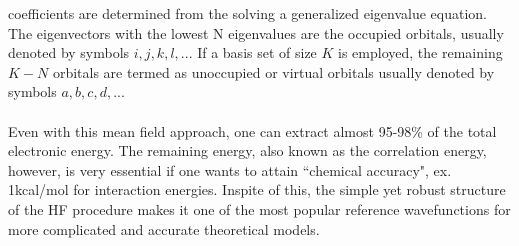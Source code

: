 coefficients are determined from the solving a generalized eigenvalue equation.
The eigenvectors with the lowest N eigenvalues are the occupied orbitals, usually 
denoted by symbols $i,j,k,l,..$. If a basis set of size $K$ is employed, the remaining $K-N$
orbitals are termed as unoccupied or virtual orbitals usually denoted by symbols $a,b,c,d,..$.
\\\\
Even with this mean field approach, one can extract almost 95-98\% of the total 
electronic energy. The remaining energy, also known as the correlation energy,
however, is very essential if one wants to attain ``chemical accuracy", ex.  
1kcal/mol for interaction energies. Inspite of this, the simple yet robust 
structure of the HF procedure makes it one of the most popular reference 
wavefunctions for more complicated and accurate theoretical models.
